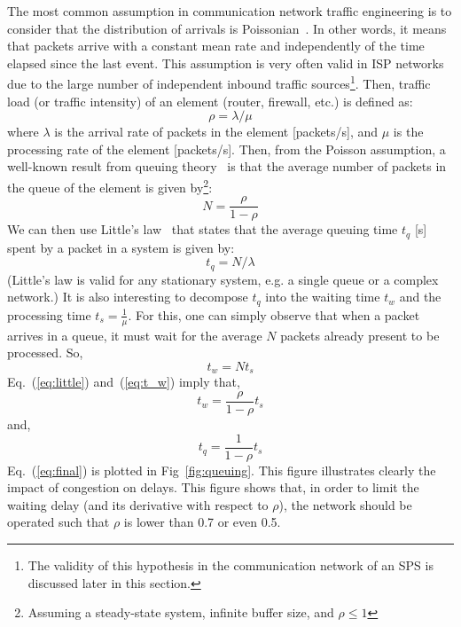 The most common assumption in communication network traffic engineering is to consider that the distribution of arrivals is Poissonian~\cite{trafficBook}. In other words, it means that packets arrive with a constant mean rate and independently of the time elapsed since the last event. This assumption is very often valid in ISP networks due to the large number of independent inbound traffic sources\footnote{The validity of this hypothesis in the communication network of an SPS is discussed later in this section.}. Then, traffic load (or traffic intensity) of an element (router, firewall, etc.) is defined as:
%
\begin{equation}
\rho = \lambda/\mu
\end{equation}
%
where \(\lambda\) is the arrival rate of packets in the element [packets/s], and \(\mu\) is the processing rate of the element [packets/s]. Then, from the Poisson assumption, a well-known result from queuing theory~\cite{trafficBook} is that the average number of packets in the queue of the element is given by\footnote{Assuming a steady-state system, infinite buffer size, and \(\rho \leq 1\)}:
%
\begin{equation}
N = \frac{\rho}{1-\rho}
\end{equation}
%
We can then use Little's law~\cite{littleLaw} that states that the average queuing time \(t_q\) [s] spent by a packet in a system is given by:
%
\begin{equation}
\label{eq:little}
t_q = N/\lambda
\end{equation}
%
(Little's law is valid for any stationary system, e.g. a single queue or a complex network.) It is also interesting to decompose \(t_q\) into the waiting time \(t_w\) and the processing time \(t_s = \frac{1}{\mu}\). For this, one can simply observe that when a packet arrives in a queue, it must wait for the average \(N\) packets already present to be processed. So,
%
\begin{equation}
\label{eq:t_w}
t_w = N t_s
\end{equation}
%
Eq.~(\ref{eq:little}) and~(\ref{eq:t_w}) imply that,
%
\begin{equation}
t_w = \frac{\rho}{1-\rho} t_s
\end{equation}
%
and,
%
\begin{equation}
\label{eq:final}
t_q = \frac{1}{1-\rho} t_s
\end{equation}
%
Eq.~(\ref{eq:final}) is plotted in Fig~\ref{fig:queuing}. This figure illustrates clearly the impact of congestion on delays. This figure shows that, in order to limit the waiting delay (and its derivative with respect to \(\rho\)), the network should be operated such that \(\rho\) is lower than 0.7 or even 0.5.

